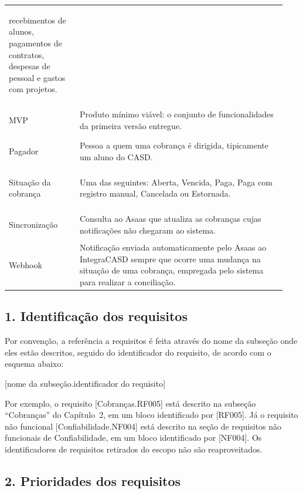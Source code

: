 \documentclass[11pt,a4paper,oneside]{report}
\begin{document}
\begin{longtable}{@{}>{\bfseries\raggedright\arraybackslash}p{0.24\linewidth} p{0.70\linewidth}@{}}
                 recebimentos de alunos, pagamentos de contratos, despesas de pessoal e gastos com
                 projetos. \\
  MVP & Produto mínimo viável: o conjunto de funcionalidades da primeira versão entregue. \\
  Pagador & Pessoa a quem uma cobrança é dirigida, tipicamente um aluno do CASD. \\
  Situação da cobrança & Uma das seguintes: Aberta, Vencida, Paga, Paga com registro manual,
                         Cancelada ou Estornada. \\
  Sincronização & Consulta ao Asaas que atualiza as cobranças cujas notificações não chegaram ao
                  sistema. \\
  Webhook & Notificação enviada automaticamente pelo Asaas ao IntegraCASD sempre que ocorre uma
            mudança na situação de uma cobrança, empregada pelo sistema para realizar a
            conciliação. \\
  \bottomrule
\end{longtable}

\subsection*{1. Identificação dos requisitos}

Por convenção, a referência a requisitos é feita através do nome da subseção onde eles estão
descritos, seguido do identificador do requisito, de acordo com o esquema abaixo:
\begin{center}
  [nome da subseção.identificador do requisito]
\end{center}
Por exemplo, o requisito [Cobranças.RF005] está descrito na subseção ``Cobranças'' do
Capítulo~2, em um bloco identificado por [RF005]. Já o requisito não funcional
[Confiabilidade.NF004] está descrito na seção de requisitos não funcionais de Confiabilidade, em um
bloco identificado por [NF004]. Os identificadores de requisitos retirados do escopo não são
reaproveitados.

\subsection*{2. Prioridades dos requisitos}
\end{document}
